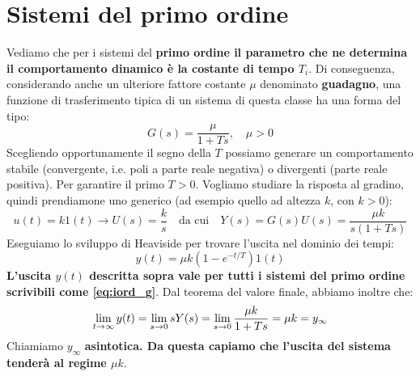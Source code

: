 \section{Sistemi del primo ordine}
Vediamo che per i sistemi del \textbf{primo ordine il parametro che ne determina il comportamento dinamico è la costante di tempo $T_i$}.
Di conseguenza, considerando anche un ulteriore fattore costante $\mu$ denominato \textbf{guadagno}, una funzione di trasferimento tipica di un sistema di questa classe ha una forma del tipo:
\begin{equation}
\label{eq:iord_g}
G(s) = \frac{\mu}{1+Ts}, \quad \mu > 0
\end{equation}
Scegliendo opportunamente il segno della $T$ possiamo generare un comportamento stabile (convergente, i.e. poli a parte reale negativa) o divergenti (parte reale positiva). Per garantire il primo \rarr $T > 0$. Vogliamo studiare la risposta al gradino, quindi prendiamone uno generico (ad esempio quello ad altezza $k$, con $k>0$):
\begin{equation*}
u(t) = k1(t) \rightarrow U(s) = \frac{k}{s} \quad \textrm{da cui} \quad Y(s) = G(s)U(s) = \frac{\mu k}{s(1+Ts)}
\end{equation*}
Eseguiamo lo sviluppo di Heaviside per trovare l'uscita nel dominio dei tempi:
\begin{equation}
y(t) = \mu k (1-e^{-t/T})1(t)
\end{equation}
\textbf{L'uscita $y(t)$ descritta sopra vale per tutti i sistemi del primo ordine scrivibili come \eqref{eq:iord_g}}. Dal teorema del valore finale, abbiamo inoltre che:
\begin{equation}
\lim_{t \rightarrow \infty} y(t) = \lim_{s \rightarrow 0} sY(s) = \lim_{s \rightarrow 0} \frac{\mu k}{1+Ts} = \mu k = y_\infty
\end{equation}
Chiamiamo $y_\infty$ \textbf{asintotica. Da questa capiamo che l'uscita del sistema tenderà al regime $\mu k$}.

